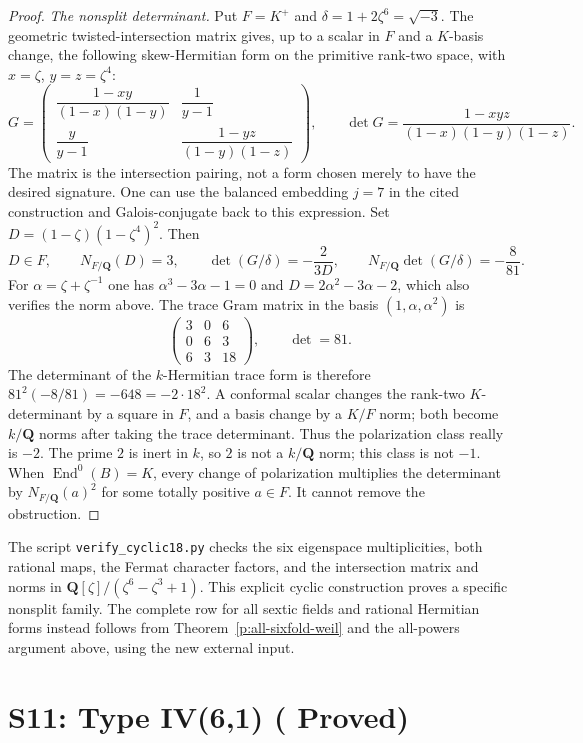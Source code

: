 \documentclass[11pt,reqno]{article}
\theoremstyle{emphasizedplain}
\DeclareRobustCommand{\provedstatus}{%
  \texorpdfstring{\textcolor{ProvedGreen}{\textbf{Proved}}}{Proved}}
\theoremstyle{emphasizeddefinition}
\theoremstyle{emphasizeddefinition}
\DeclareMathOperator{\End}{End}
\newcommand{\Q}{\mathbf Q}
\begin{document}
\begin{proof}
\emph{The nonsplit determinant.}
Put $F=K^+$ and $\delta=1+2\zeta^6=\sqrt{-3}$.
The geometric twisted-intersection matrix
\cite[Proposition 7.4]{YuZheng} gives, up to a scalar in $F$
and a $K$-basis change, the following skew-Hermitian form on
the primitive rank-two space, with $x=\zeta$, $y=z=\zeta^4$:
\[
 G=\begin{pmatrix}
 \dfrac{1-xy}{(1-x)(1-y)}&\dfrac1{y-1}\\[6pt]
 \dfrac{y}{y-1}&\dfrac{1-yz}{(1-y)(1-z)}
 \end{pmatrix},\qquad
 \det G=\frac{1-xyz}{(1-x)(1-y)(1-z)}.
\]
The matrix is the intersection pairing, not a form chosen merely
to have the desired signature. One can use the balanced embedding
$j=7$ in the cited construction and Galois-conjugate back to this
expression. Set $D=(1-\zeta)(1-\zeta^4)^2$. Then
\[
 D\in F,\qquad N_{F/\Q}(D)=3,\qquad
 \det(G/\delta)=-\frac2{3D},\qquad
 N_{F/\Q}\det(G/\delta)=-\frac8{81}.
\]
For $\alpha=\zeta+\zeta^{-1}$ one has
$\alpha^3-3\alpha-1=0$ and $D=2\alpha^2-3\alpha-2$,
which also verifies the norm above. The trace Gram matrix in the basis
$(1,\alpha,\alpha^2)$ is
\[
 \begin{pmatrix}3&0&6\\0&6&3\\6&3&18\end{pmatrix},
 \qquad \det=81.
\]
The determinant of the $k$-Hermitian trace form is therefore
$81^2(-8/81)=-648=-2\cdot18^2$. A conformal scalar changes the
rank-two $K$-determinant by a square in $F$, and a basis change
by a $K/F$ norm; both become $k/\Q$ norms after taking the trace
determinant. Thus the polarization class really is $-2$.
The prime $2$ is inert in $k$, so $2$ is not a $k/\Q$ norm;
this class is not $-1$. When $\End^0(B)=K$, every change of
polarization multiplies the determinant by $N_{F/\Q}(a)^2$
for some totally positive $a\in F$. It cannot remove the obstruction.
\end{proof}

The script \texttt{verify\_cyclic18.py} checks the six eigenspace
multiplicities, both rational maps, the Fermat character factors,
and the intersection matrix and norms in $\Q[\zeta]/(\zeta^6-\zeta^3+1)$.
This explicit cyclic construction proves a specific nonsplit family.
The complete row for all sextic fields and rational Hermitian forms
instead follows from Theorem~\ref{p:all-sixfold-weil} and the
all-powers argument above, using the new external input.

\section{S11: Type IV(6,1) (\provedstatus)}\label{sec:S11}
\end{document}
